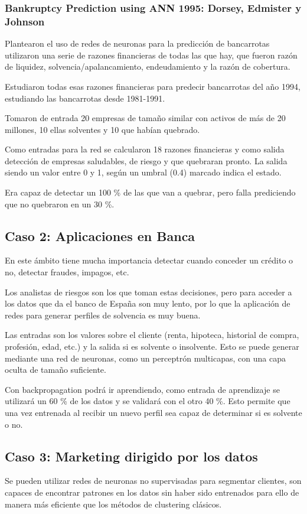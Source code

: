 \documentclass[12pt, twoside, openright]{report} %
\begin{document}
\subsubsection{Bankruptcy Prediction using ANN 1995: Dorsey, Edmister y Johnson}
Plantearon el uso de redes de neuronas para la predicción de bancarrotas utilizaron una serie de razones financieras de todas las que hay, que fueron razón de liquidez, solvencia/apalancamiento, endeudamiento y la razón de cobertura.

Estudiaron todas esas razones financieras para predecir bancarrotas del año 1994, estudiando las bancarrotas desde 1981-1991.

Tomaron de entrada 20 empresas de tamaño similar con activos de más de 20 millones, 10 ellas solventes y 10 que habían quebrado.

Como entradas para la red se calcularon 18 razones financieras y como salida detección de empresas saludables, de riesgo y que quebraran pronto. La salida siendo un valor entre 0 y 1, según un umbral (0.4) marcado indica el estado.

Era capaz de detectar un 100 \% de las que van a quebrar, pero falla prediciendo que no quebraron en un 30 \%.

\subsection{Caso 2: Aplicaciones en Banca}
En este ámbito tiene mucha importancia detectar cuando conceder un crédito o no, detectar fraudes, impagos, etc.

Los analistas de riesgos son los que toman estas decisiones, pero para acceder a los datos que da el banco de España son muy lento, por lo que la aplicación de redes para generar perfiles de solvencia es muy buena.

Las entradas son los valores sobre el cliente (renta, hipoteca, historial de compra, profesión, edad, etc.) y la salida si es solvente o insolvente. Esto se puede generar mediante una red de neuronas, como un perceptrón multicapas, con una capa oculta de tamaño suficiente.

Con backpropagation podrá ir aprendiendo, como entrada de aprendizaje se utilizará un 60 \% de los datos y se validará con el otro 40 \%. Esto permite que una vez entrenada al recibir un nuevo perfil sea capaz de determinar si es solvente o no.

\subsection{Caso 3: Marketing dirigido por los datos}
Se pueden utilizar redes de neuronas no supervisadas para segmentar clientes, son capaces de encontrar patrones en los datos sin haber sido entrenados para ello de manera más eficiente que los métodos de clustering clásicos.
\end{document}
